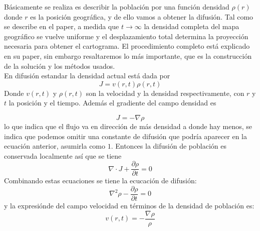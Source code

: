 \documentclass[20pt]{report}
\begin{document}
\begin{itemize}
B\'asicamente se  realiza es describir la poblaci\'on  por una funci\'on densidad $\rho (r)$ donde $r$ es la posici\'on geogr\'afica, y de ello vamos a obtener la difusi\'on. Tal como se describe en el paper, a medida que $t\longrightarrow \infty$  la densidad completa del mapa geogr\'afico se vuelve  uniforme y el desplazamiento total determina la proyecci\'on necesaria para obtener el cartograma.
El procedimiento completo est\'a explicado en su paper, sin embargo resaltaremos lo m\'as importante,  que es la construcci\'on de la soluci\'on y  los m\'etodos usados.
\\
En difusi\'on estandar la densidad actual est\'a dada por
\begin{equation}
J= v(r,t)\rho (r,t)
\end{equation}
Donde $v(r,t)$ y $\rho(r,t)$ son la velocidad y la densidad respectivamente, con $r$ y $t$ la posici\'on y el tiempo. Adem\'as el gradiente del campo densidad es

\begin{equation}
J=-\nabla \rho
\end{equation}
lo que indica que el flujo  va en direcci\'on  de  m\'as densidad a donde hay menos, se indica que podemos omitir  una constante de difusi\'on  que podr\'ia aparecer en la ecuaci\'on anterior, asumirla como $1$. Entonces la difusi\'on de poblaci\'on es conservada localmente  as\'i que  se tiene 
\begin{equation}
\nabla \cdot J + \dfrac{\partial \rho}{\partial t} =0
\end{equation}
Combinando estas ecuaciones se tiene la ecucaci\'on de difusi\'on:
\begin{equation}
\nabla ^2 \rho - \dfrac{\partial \rho }{\partial t}=0
\end{equation}
y la expresi\'onde del  campo velocidad en t\'erminos de la densidad de poblaci\'on es:
\begin{equation}
v(r,t)= - \dfrac{\nabla \rho}{\rho}
\end{equation}



\end{itemize}
\end{document}

